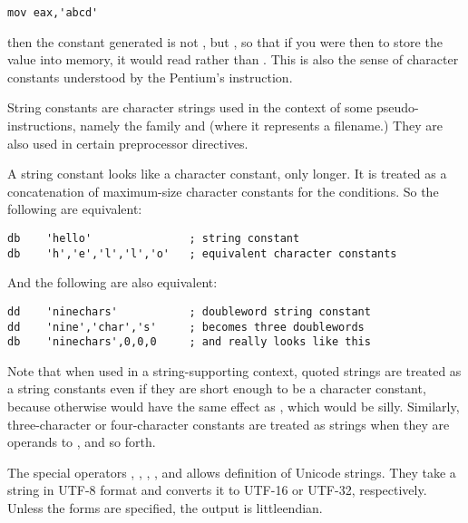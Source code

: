 \begin{lstlisting}
mov eax,'abcd'
\end{lstlisting}

then the constant generated is not , but ,
so that if you were then to store the value into memory, it would read
 rather than . This is also the sense of character
constants understood by the Pentium's  instruction.


String constants are character strings used in the context of some
pseudo-instructions, namely the 
 family and
 (where it represents a filename.) They are also used in
certain preprocessor directives.

A string constant looks like a character constant, only longer. It
is treated as a concatenation of maximum-size character constants
for the conditions. So the following are equivalent:

\begin{lstlisting}
db    'hello'               ; string constant
db    'h','e','l','l','o'   ; equivalent character constants
\end{lstlisting}

And the following are also equivalent:

\begin{lstlisting}
dd    'ninechars'           ; doubleword string constant
dd    'nine','char','s'     ; becomes three doublewords
db    'ninechars',0,0,0     ; and really looks like this
\end{lstlisting}

Note that when used in a string-supporting context, quoted strings are
treated as a string constants even if they are short enough to be a
character constant, because otherwise  would have the same
effect as , which would be silly. Similarly, three-character
or four-character constants are treated as strings when they are
operands to , and so forth.


The special operators , ,
, , 
and  allows definition of Unicode strings.
They take a string in UTF-8 format and converts it to UTF-16 or UTF-32,
respectively. Unless the  forms are specified, the output is
littleendian.

